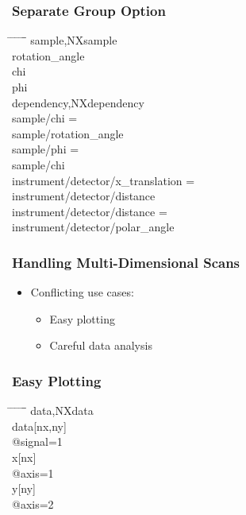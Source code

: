 \documentclass{beamer}
\begin{document}
\begin{frame} \frametitle{Separate Group Option}
\begin{tabbing}
\hspace*{1cm} \= \hspace*{1cm} \= \hspace*{1cm} \= \hspace*{1cm} \= \hspace*{1cm} \= \hspace*{1cm}\= \kill
\>sample,NXsample\\
\> \>rotation\_angle\\
\> \>chi \\
\> \>phi \\
\>dependency,NXdependency\\
\> \>sample/chi = \\
\> \> \>sample/rotation\_angle\\
\> \>sample/phi =\\
\> \> \> sample/chi\\
\> \>instrument/detector/x\_translation = \\
\> \> \>instrument/detector/distance\\
\> \>instrument/detector/distance = \\
\> \> \>instrument/detector/polar\_angle\\
\end{tabbing}
\end{frame}



\begin{frame} \frametitle{Handling Multi-Dimensional Scans}
\begin{itemize}
\item Conflicting use cases:
\begin{itemize}
\item Easy plotting
\item Careful data analysis
\end{itemize}
\end{itemize}
\end{frame}

\begin{frame} \frametitle{Easy Plotting}
\begin{tabbing}
\hspace*{1cm} \= \hspace*{1cm} \= \hspace*{1cm} \= \hspace*{1cm} \= \hspace*{1cm} \= \hspace*{1cm}\= \kill
\>data,NXdata\\
\> \>data[nx,ny]\\
\> \> \>@signal=1 \\
\> \>x[nx]\\
\> \> \>@axis=1\\
\> \>y[ny]\\
\> \> \>@axis=2\\
\end{tabbing}
\end{frame}
\end{document}
